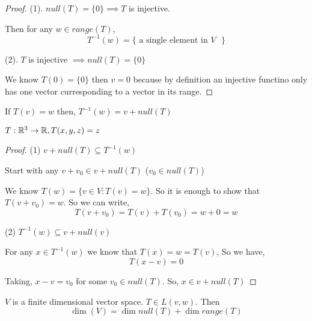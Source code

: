 \begin{proof}
    (1). $null(T) = \{0\} \implies T$ is injective.

    Then for any  $w \in range(T)$, 
    $$ T^{-1}(w) = \{\text{ a single element in $V$ }\} $$ 


    (2). $T$ is injective $\implies null(T) = \{0\}$ 

    We know $T(0) = \{0\}$ then  $v = 0$ because by definition an injective functino only has one vector curresponding to a vector in its range.
\end{proof}

\begin{lemma}
    If $T(v) = w$ then, $T^{-1}(w) = v + null(T)$
\end{lemma}

\begin{eg}
    $T: \mathbb{R}^3 \rightarrow \mathbb{R}, T(x,y,z) = z$
\end{eg}

\begin{proof}
    (1) $v + null(T) \subseteq T^{-1}(w)$ 

    Start with any $v + v_0 \in v + null(T)$ ($v_0 \in null(T)$)

    We know $T(w) = \{v \in V: T(v) = w\}$. So it is enough to show that $T(v + v_0) = w$. So we can write, 
    $$ T(v+ v_0) = T(v) + T(v_0) = w + 0 = w$$ 

    (2) $T^{-1}(w) \subseteq v + null(v)$
    
    For any $x \in T^{-1}(w)$ we know that $T(x) = w = T(v)$, 
    So we have, $$ T(x - v) = 0 $$ 

    Taking, $x - v = v_0$ for some $v_0 \in null(T)$. So, $x \in v + null(T)$
\end{proof}


\begin{theorem}
    $V$ is a finite dimensional vector space.  $T \in L(v,w)$. Then 
    $$\dim (V) = \dim null (T) + \dim range(T)$$ 
\end{theorem}

